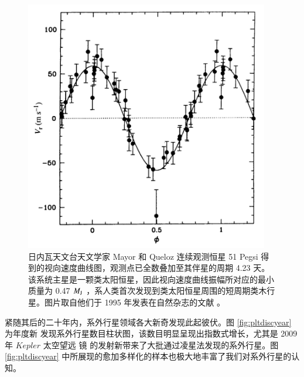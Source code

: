 \begin{figure}[ht]
\centering
\includegraphics[width=0.95\textwidth]{figures/chapter1/fig2_51pegsi.jpg}
\caption[1995 年，日内瓦天文台天文学家 Mayor 和 Queloz 连续观测恒星 51 Pegsi 得到的视向速度曲线图，观测点已全数叠加至其伴星的周期 4.23 天。该系统主星是一颗类太阳恒星，因此视向速度曲线振幅所对应的最小质量为 0.47 $M_\tif{J}$ ，系人类首次发现到类太阳恒星周围的短周期类木行星。]{日内瓦天文台天文学家 Mayor 和 Queloz 连续观测恒星 51 Pegsi 得到的视向速度曲线图，观测点已全数叠加至其伴星的周期 4.23 天。该系统主星是一颗类太阳恒星，因此视向速度曲线振幅所对应的最小质量为 0.47 $M_\tif{J}$ ，系人类首次发现到类太阳恒星周围的短周期类木行星。图片取自他们于 1995 年发表在自然杂志的文献 。}
\label{fig:51pegsi}
\end{figure}

紧随其后的二十年内，系外行星领域各大新奇发现此起彼伏。图 \ref{fig:pltdiscyear} 为年度新
发现系外行星数目柱状图，该数目明显呈现出指数式增长，尤其是 2009 年 $Kepler$ 太空望远
镜\cite{Boruckietal2010} 的发射新带来了大批通过凌星法发现的系外行星。图\ref{fig:pltdiscyear} 
中所展现的愈加多样化的样本也极大地丰富了我们对系外行星的认知。

